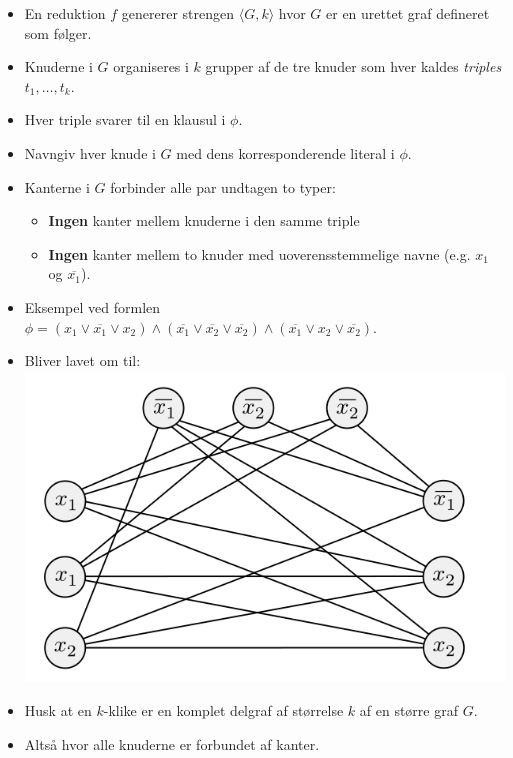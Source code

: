 \begin{frame}[allowframebreaks]
\begin{itemize}
		\item En reduktion $f$ genererer strengen $\langle G, k \rangle$ hvor $G$ er en urettet graf defineret som følger.
		\item Knuderne i $G$ organiseres i $k$ grupper af de tre knuder som hver kaldes \textit{triples} $t_{1}, \ldots, t_{k}$.
		\item Hver triple svarer til en klausul i $\phi$.
		\item Navngiv hver knude i $G$ med dens korresponderende literal i $\phi$.
		\item Kanterne i $G$  forbinder alle par undtagen to typer:
		      \begin{itemize}
			      \item \textbf{Ingen} kanter mellem knuderne i den samme triple
			      \item \textbf{Ingen} kanter mellem to knuder med uoverensstemmelige navne (e.g. $x_{1}$ og $\overline{x_{1}}$).
		      \end{itemize}

		\item Eksempel ved formlen $\phi = (x_1 \lor \overline{x_1} \lor x_2) \land (\overline{x_1} \lor \overline{x_2} \lor \overline{x_2}) \land (\overline{x_1} \lor x_2 \lor \overline{x_2}).$

		\item Bliver lavet om til:
		      \includegraphics[scale=0.5]{figur/figur733.png}
		\item Husk at en $k$-klike er en komplet delgraf af størrelse $k$ af en større graf $G$.
		\item Altså hvor alle knuderne er forbundet af kanter.
	\end{itemize}


\end{frame}
